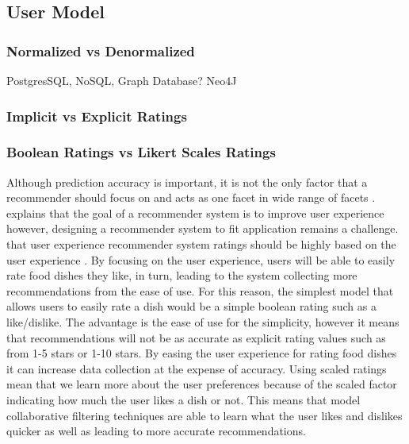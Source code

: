 \subsection{User Model}

\subsubsection{Normalized vs Denormalized}

PostgresSQL, NoSQL, Graph Database? Neo4J

\subsubsection{Implicit vs Explicit Ratings}

\subsubsection{Boolean Ratings vs Likert Scales Ratings}

Although prediction accuracy is important, it is not the only factor that a recommender should focus on and acts as one facet in wide range of facets \cite{martin2009recsys}. \citeauthor{martin2009recsys} explains that the goal of a recommender system is to improve user experience however, designing a recommender system to fit application remains a challenge.  that user experience recommender system ratings should be highly based on the user experience \cite{martin2009recsys}. By focusing on the user experience, users will be able to easily rate food dishes they like, in turn, leading to the system collecting more recommendations from the ease of use. For this reason, the simplest model that allows users to easily rate a dish would be a simple boolean rating such as a like/dislike. The advantage is the ease of use for the simplicity, however it means that recommendations will not be as accurate as explicit rating values such as from 1-5 stars or 1-10 stars. By easing the user experience for rating food dishes it can increase data collection at the expense of accuracy. Using scaled ratings mean that we learn more about the user preferences because of the scaled factor indicating how much the user likes a dish or not. This means that model collaborative filtering techniques are able to learn what the user likes and dislikes quicker as well as leading to more accurate recommendations. 

